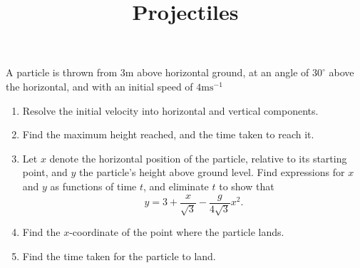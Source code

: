 \documentclass{article}
\begin{document}
\title{Projectiles}
\date{}

\maketitle
\thispagestyle{empty}

\Large

A particle is thrown from 3m above horizontal ground, at an angle of $30^\circ$ above the horizontal, and with an initial speed of $4\mathrm{ms}^{-1}$

\begin{enumerate}
	\item Resolve the initial velocity into horizontal and vertical components.
	\item Find the maximum height reached, and the time taken to reach it.
	\item Let $x$ denote the horizontal position of the particle, relative to its starting point, and $y$ the particle's height above ground level. Find expressions for $x$ and $y$ as functions of time $t$, and eliminate $t$ to show that %
		\[y=3+\frac{x}{\sqrt{3}} - \frac{g}{4\sqrt{3}}x^2.\]
	\item Find the $x$-coordinate of the point where the particle lands.
	\item Find the time taken for the particle to land.
\end{enumerate}
\end{document}
